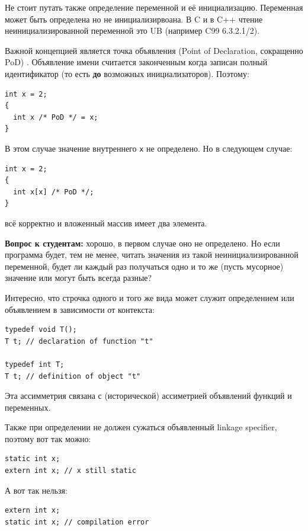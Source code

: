 \documentclass[a4paper,12pt,oneside]{book}
\newif\ifanswers
\begin{document}
Не стоит путать также определение переменной и её инициализацию. Переменная может быть определена но не инициализирвоана. В C и в C++ чтение неинициализированной переменной это UB (например C99 6.3.2.1/2).

Важной концепцией является точка объявления (Point of Declaration, сокращенно PoD) . Объявление имени считается законченным когда записан полный идентификатор (то есть \textbf{до} возможных инициализаторов). Поэтому:

\begin{lstlisting}
int x = 2;
{
  int x /* PoD */ = x;
}
\end{lstlisting}

В этом случае значение внутреннего \lstinline!x! не определено. Но в следующем случае:

\begin{lstlisting}
int x = 2;
{
  int x[x] /* PoD */;
}
\end{lstlisting}

всё корректно и вложенный массив имеет два элемента.

\textbf{Вопрос к студентам:} хорошо, в первом случае оно не определено. Но если программа будет, тем не менее, читать значения из такой неинициализированной переменной, будет ли каждый раз получаться одно и то же (пусть мусорное) значение или могут быть всегда разные?

\ifanswers
Ответ: могут быть всегда разные, так как UB
\fi

Интересно, что строчка одного и того же вида может служит определением или объявлением в зависимости от контекста:

\begin{lstlisting}
typedef void T();
T t; // declaration of function "t"

typedef int T;
T t; // definition of object "t"
\end{lstlisting}

Эта ассимметрия связана с (исторической) ассиметрией объявлений функций и переменных.

Также при определении не должен сужаться объявленный linkage specifier, поэтому вот так можно:

\begin{lstlisting}
static int x;
extern int x; // x still static
\end{lstlisting}

А вот так нельзя:

\begin{lstlisting}
extern int x;
static int x; // compilation error
\end{lstlisting}
\end{document}
